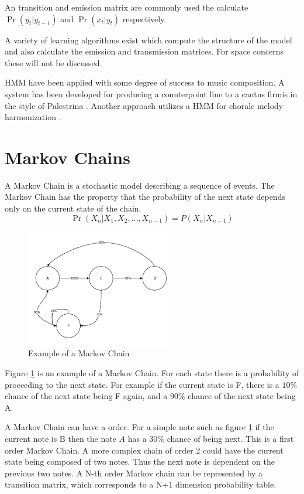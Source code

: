 An transition and emission matrix are commonly used the calculate $\Pr(y_t|y_{t-1})$ and $\Pr(x_t|y_t)$ respectively.

A variety of learning algorithms exist which compute the structure of the model and also calculate the emission and transmission matrices. For space concerns these will not be discussed.

\acs{HMM} have been applied with some degree of success to music composition. A system has been developed for producing a counterpoint line to a cantus firmis in the style of Palestrina \cite{Farbood2001}. Another approach utilizes a \ac{HMM} for chorale melody harmonization \cite{Allan2004}.



\section{Markov Chains} \label{sec:markov_backround}
A Markov Chain is a stochastic model describing a sequence of events. The Markov Chain has the property that the probability of the next state depends only on the current state of the chain.
\[ \Pr(X_n | X_1, X_2, \ldots, X_{n-1}) = P(X_n | X_{n-1})  \]

\begin{figure}
\center
\includegraphics[width=250px]{../images/markov_chain_example.pdf}
\caption{Example of a Markov Chain}
\label{ims:markov_chain_example}
\end{figure}

Figure \ref{ims:markov_chain_example} is an example of a Markov Chain. For each state there is a probability of proceeding to the next state. For example if the current state is F, there is a $10\%$ chance of the next state being F again, and a $90\%$ chance of the next state being A.

A Markov Chain can have a order. For a simple note such as figure \ref{ims:markov_chain_example} if the current note is B then the note $A$ has a $30\%$ chance of being next. This is a first order Markov Chain.  A more complex chain of order 2 could have the current state being composed of two notes. Thus the next note is dependent on the previous two notes. A N-th order Markov chain can be represented by a transition matrix, which corresponds to a N+1 dimension probability table.

